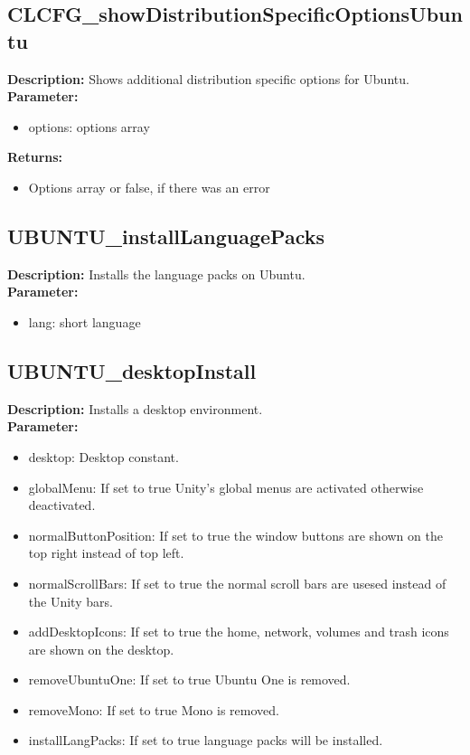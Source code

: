 \subsection{CLCFG\_showDistributionSpecificOptionsUbuntu}
\textbf{Description:} Shows additional distribution specific options for Ubuntu.\\
\textbf{Parameter:}
\begin{itemize}
\item options: options array
\end{itemize}
\textbf{Returns:}
\begin{itemize}
\item Options array or false, if there was an error
\end{itemize}

\subsection{UBUNTU\_installLanguagePacks}
\textbf{Description:} Installs the language packs on Ubuntu.\\
\textbf{Parameter:}
\begin{itemize}
\item lang: short language
\end{itemize}

\subsection{UBUNTU\_desktopInstall}
\textbf{Description:} Installs a desktop environment.\\
\textbf{Parameter:}
\begin{itemize}
\item desktop: Desktop constant.
\item globalMenu: If set to true Unity's global menus are activated otherwise deactivated.
\item normalButtonPosition: If set to true the window buttons are shown on the top right instead of top left.
\item normalScrollBars: If set to true the normal scroll bars are usesed instead of the Unity bars.
\item addDesktopIcons: If set to true the home, network, volumes and trash icons are shown on the desktop.
\item removeUbuntuOne: If set to true Ubuntu One is removed.
\item removeMono: If set to true Mono is removed.
\item installLangPacks: If set to true language packs will be installed.
\end{itemize}

